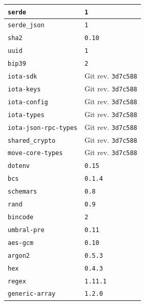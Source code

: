 \begin{longtable}{|>{\raggedright\arraybackslash}p{}|>{\raggedright\arraybackslash}p{}|}
	\texttt{serde}                        & \texttt{1}                \\ \hline
	\texttt{serde\_json}                  & \texttt{1}                \\ \hline
	\texttt{sha2}                         & \texttt{0.10}             \\ \hline
	\texttt{uuid}                         & \texttt{1}                \\ \hline
	\texttt{bip39}                        & \texttt{2}                \\ \hline
	\texttt{iota-sdk}                     & Git rev. \texttt{3d7c588} \\ \hline
	\texttt{iota-keys}                    & Git rev. \texttt{3d7c588} \\ \hline
	\texttt{iota-config}                  & Git rev. \texttt{3d7c588} \\ \hline
	\texttt{iota-types}                   & Git rev. \texttt{3d7c588} \\ \hline
	\texttt{iota-json-rpc-types}          & Git rev. \texttt{3d7c588} \\ \hline
	\texttt{shared\_crypto}               & Git rev. \texttt{3d7c588} \\ \hline
	\texttt{move-core-types}              & Git rev. \texttt{3d7c588} \\ \hline
	\texttt{dotenv}                       & \texttt{0.15}             \\ \hline
	\texttt{bcs}                          & \texttt{0.1.4}            \\ \hline
	\texttt{schemars}                     & \texttt{0.8}              \\ \hline
	\texttt{rand}                         & \texttt{0.9}              \\ \hline
	\texttt{bincode}                      & \texttt{2}                \\ \hline
	\texttt{umbral-pre}                   & \texttt{0.11}             \\ \hline
	\texttt{aes-gcm}                      & \texttt{0.10}             \\ \hline
	\texttt{argon2}                       & \texttt{0.5.3}            \\ \hline
	\texttt{hex}                          & \texttt{0.4.3}            \\ \hline
	\texttt{regex}                        & \texttt{1.11.1}           \\ \hline
	\texttt{generic-array}                & \texttt{1.2.0}            \\ \hline

\end{longtable}
